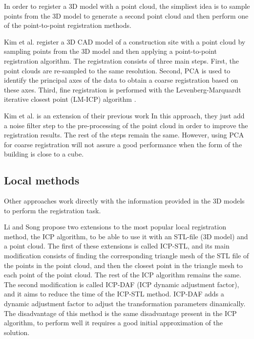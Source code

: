         In order to register a 3D model with a point cloud, the simpliest idea is to sample points from the 3D model to generate a second point cloud
        and then perform one of the point-to-point registration methods. 

        Kim et al. \cite{Kim_2011_fully} register a 3D CAD model of a construction site with a point cloud by sampling points from the 3D model 
        and then applying a point-to-point registration algorithm. The registration consists of three main steps. First, 
        the point clouds are re-sampled to the same resolution. Second, PCA is used to identify the principal axes of the data 
        to obtain a coarse registration based on these axes. Third, fine registration is performed with the Levenberg-Marquardt
        iterative closest point (LM-ICP) algorithm \cite{Fitzgibbon_2003_robust}. 
        
        Kim et al. \cite{Kim_2013_fully} is an extension of their previous work \cite{Kim_2011_fully}
        In this approach, they just add a noise filter step to the pre-processing of the point cloud in order to improve the registration results.
        The rest of the steps remain the same.
        However, using PCA for coarse registration will not assure a good performance when the form of the building is close to a cube.
        
        \subsection{Local methods}

        Other approaches work directly with the information provided in the 3D models to perform the registration task.

        Li and Song \cite{Li_2015_amodified} propose two extensions to the most popular local registration method, the ICP algorithm, 
        to be able to use it with an STL-file (3D model) and a point cloud.
        The first of these extensions is called ICP-STL, and its main modification consists of finding the corresponding triangle mesh of the STL file of the points 
        in the point cloud, and then the closest point in the triangle mesh to each point of the point cloud. The rest of the ICP algorithm remains the same.
        The second modification is called ICP-DAF (ICP dynamic adjustment factor), and it aims to reduce the time of the ICP-STL method. 
        ICP-DAF adds a dynamic adjustment factor to adjust the transformation parameters dinamically.
        The disadvantage of this method is the same disadvantage present in the ICP algorithm, to perform well it requires a good initial approximation of the solution.

